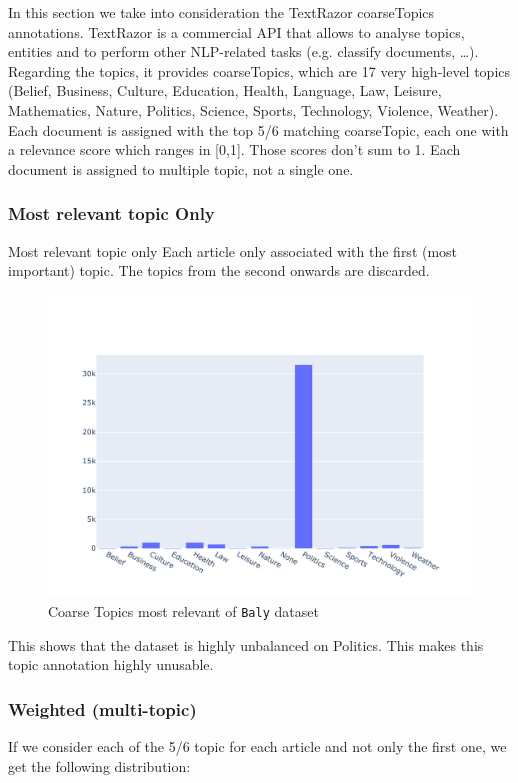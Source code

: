 In this section we take into consideration the TextRazor coarseTopics annotations. TextRazor is a commercial API that allows to analyse topics, entities and to perform other NLP-related tasks (e.g. classify documents, …).
Regarding the topics, it provides coarseTopics, which are 17 very high-level topics (Belief, Business, Culture, Education, Health, Language, Law, Leisure, Mathematics, Nature, Politics, Science, Sports, Technology, Violence, Weather).
Each document is assigned with the top 5/6 matching coarseTopic, each one with a relevance score which ranges in [0,1]. Those scores don’t sum to 1. Each document is assigned to multiple topic, not a single one.

\subsubsection{Most relevant topic Only}

Most relevant topic only
Each article only associated with the first (most important) topic. The topics from the second onwards are discarded.

\begin{figure}[!htbp]
    \centering
    \includegraphics[width=\linewidth]{figures/baly_coarse_first.pdf}
    \caption{Coarse Topics most relevant of \texttt{Baly} dataset}
    \label{fig:baly_coarse_first}
\end{figure}

This shows that the dataset is highly unbalanced on Politics. This makes this topic annotation highly unusable.

\subsubsection{Weighted (multi-topic)}
If we consider each of the 5/6 topic for each article and not only the first one, we get the following distribution:

